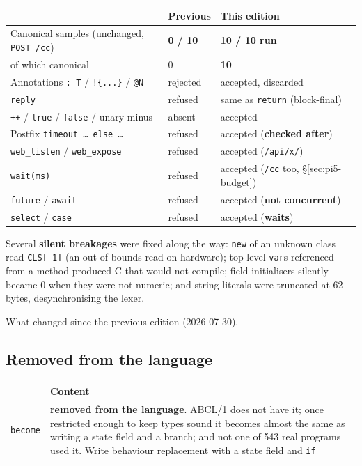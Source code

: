 \documentclass[11pt,a4paper]{article}
\begin{document}
\begin{center}
\small
\begin{tabular}{@{}lll@{}}
\toprule
 & Previous & This edition \\
\midrule
Canonical samples (unchanged, \texttt{POST /cc}) & \textbf{0 / 10} & \textbf{10 / 10 run} \\
\quad of which canonical & 0 & \textbf{10} \\
Annotations \texttt{: T} / \texttt{!\{...\}} / \texttt{@N} & rejected & accepted, discarded \\
\texttt{reply} & refused & same as \texttt{return} (block-final) \\
\texttt{++} / \texttt{true} / \texttt{false} / unary minus & absent & accepted \\
Postfix \texttt{timeout … else …} & refused & accepted (\textbf{checked after}) \\
\texttt{web\_listen} / \texttt{web\_expose} & refused & accepted (\texttt{/api/x/}) \\
\texttt{wait(ms)} & refused & accepted (\texttt{/cc} too, \S\ref{sec:pi5-budget}) \\
\texttt{future} / \texttt{await} & refused & accepted (\textbf{not concurrent}) \\
\texttt{select} / \texttt{case} & refused & accepted (\textbf{waits}) \\
\bottomrule
\end{tabular}
\end{center}

Several \textbf{silent breakages} were fixed along the way: \texttt{new} of an
unknown class read \texttt{CLS[-1]} (an out-of-bounds read on hardware);
top-level \texttt{var}s referenced from a method produced C that would not
compile; field initialisers silently became 0 when they were not numeric; and
string literals were truncated at 62 bytes, desynchronising the lexer.

\label{sec:migrate}

What changed since the previous edition (2026-07-30).

\subsection{Removed from the language}

\begin{center}
\small
\begin{tabular}{@{}lp{8.6cm}@{}}
\toprule
 & Content \\
\midrule
\texttt{become} & \textbf{removed from the language}. ABCL/1 does not have it;
  once restricted enough to keep types sound it becomes almost the same as
  writing a state field and a branch; and not one of 543 real programs used it.
  Write behaviour replacement with a state field and \texttt{if} \\
\bottomrule
\end{tabular}
\end{center}
\end{document}
